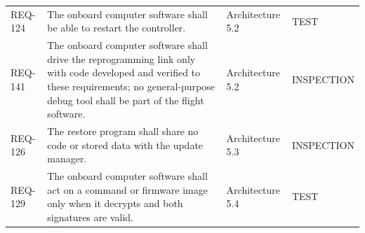 \documentclass[11pt,a4paper]{article}
\begin{document}
{\begin{xltabular}{\textwidth}{@{}l>{\raggedright\arraybackslash}X>{\raggedright\arraybackslash}p{3.2cm}>{\raggedright\arraybackslash}p{3.0cm}@{}}
REQ-124 & The onboard computer software shall be able to restart the controller. & Architecture 5.2 & TEST \\
REQ-141 & The onboard computer software shall drive the reprogramming link only with code developed and verified to these requirements; no general-purpose debug tool shall be part of the flight software. & Architecture 5.2 & INSPECTION \\
REQ-126 & The restore program shall share no code or stored data with the update manager. & Architecture 5.3 & INSPECTION \\
REQ-129 & The onboard computer software shall act on a command or firmware image only when it decrypts and both signatures are valid. & Architecture 5.4 & TEST \\
\bottomrule
\end{xltabular}}

\end{document}
